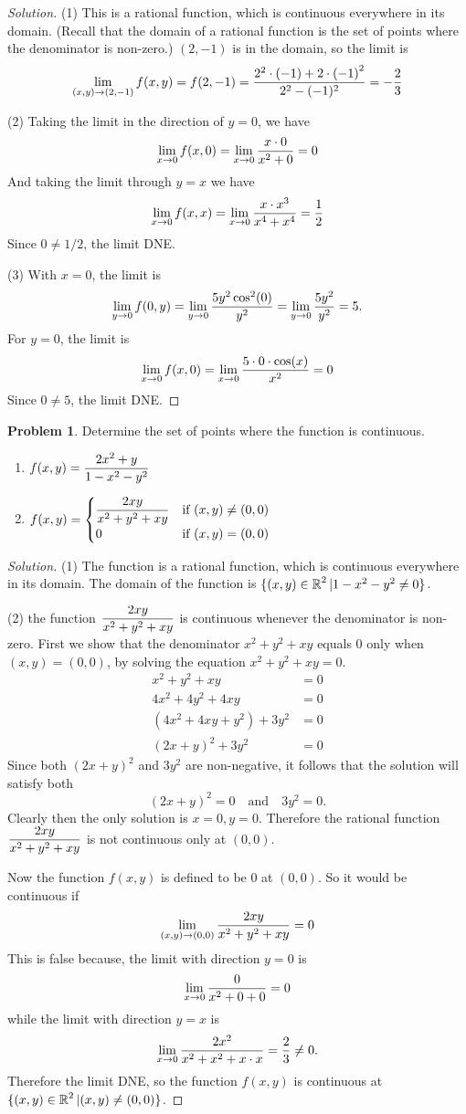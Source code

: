 \documentclass[12pt]{amsart}%
\theoremstyle{plain}
\theoremstyle{definition}
\newtheorem{prob}[theorem]{Problem}
\theoremstyle{special}
\newcommand{\sol}[1]{
{\begin{proof}[Solution]#1\end{proof}}
}
\newcommand{\Prob}[1]{\begin{tcolorbox}%
\begin{prob}
	#1
\end{prob}
\end{tcolorbox}	
}
\begin{document}
\sol{(1) This is a rational function, which is continuous everywhere in its domain. (Recall that the domain of a rational function is the set of points where the denominator is non-zero.) $(2,-1)$ is in the domain, so the limit is
\[\lim_{(x,y)\to(2,-1) }f(x,y)=f(2,-1)={2^2\cdot(-1)+2\cdot{(-1)}^2\over 2^2-(-1)^2}=-{2\over 3}\]

(2) Taking the limit in the direction of $y=0$, we have
\[\lim_{x\to 0}f(x,0)=\lim_{x\to 0}{x\cdot 0\over x^2+0}=0\]
And taking the limit through $y=x$ we have
\[\lim_{x\to 0}f(x,x)=\lim_{x\to 0}{x\cdot x^3\over x^4+x^4}={1\over 2}\]
Since $0\neq 1/2$, the limit DNE.

(3) With $x=0$, the limit is
\[\lim_{y\to 0}f(0,y)=\lim_{y\to 0}{{5y^2\cos^2(0)\over y^2}}=\lim_{y\to 0}{5y^2\over y^2}=5.\]
For $y=0$, the limit is
\[\lim_{x\to 0}f(x,0)=\lim_{x\to 0}{5\cdot 0\cdot \cos(x)\over x^2}=0\]
Since $0\neq 5$, the limit DNE.\qedhere

}
\Prob{Determine the set of points where the function is continuous.
\begin{enumerate}
	\item \(\displaystyle f(x,y)={2x^2+y\over 1-x^2-y^2}\)\vspace{0.3cm}
	\item \(\displaystyle f(x,y)=\begin{cases}{\displaystyle{2xy\over x^2+y^2+xy}}&\text{if }(x,y)\neq(0,0)\\0&\text{if }(x,y)=(0,0)	
\end{cases}
\)
\end{enumerate}
}
\sol{
(1) The function is a rational function, which is continuous everywhere in its domain. The domain of the function is $\{(x,y)\in\operatorname{\mathbb{R}}^2|1-x^2-y^2\neq 0\}$.

(2) the function $\displaystyle{2xy\over x^2+y^2+xy}$ is continuous whenever the denominator is non-zero. First we show that the denominator $x^2+y^2+xy$ equals $0$ only when $(x,y)=(0,0)$, by solving the equation $x^2+y^2+xy=0$.
\begin{align*}
x^2+y^2+xy&=0\\
4x^2+4y^2+4xy&=0\\
(4x^2+4xy+y^2)+3y^2&=0\\
(2x+y)^2+3y^2&=0	
\end{align*}
Since both $(2x+y)^2$ and $3y^2$ are non-negative, it follows that the solution will satisfy both
\[(2x+y)^2=0 \quad\text{and}\quad 3y^2=0.\]
Clearly then the only solution is $x=0,y=0$. Therefore the rational function $\displaystyle{2xy\over x^2+y^2+xy}$ is not continuous only at $(0,0)$.

Now the function $f(x,y)$ is defined to be $0$ at $(0,0)$. So it would be continuous if
\[\lim_{(x,y)\to(0,0)}{2xy\over x^2+y^2+xy}=0\]
This is false because, the limit with direction $y=0$ is
\[\lim_{x\to 0}{0\over x^2+0+0}=0\]
while the limit with direction $y=x$ is
\[\lim_{x\to 0}{2x^2\over x^2+x^2+x\cdot x}={2\over 3}\neq 0.\]
Therefore the limit DNE, so the function $f(x,y)$ is continuous at $\{(x,y)\in\operatorname{\mathbb{R}}^2|(x,y)\neq (0,0)\}$.
}
\end{document}
